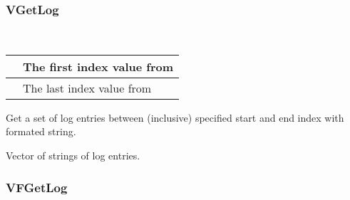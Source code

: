 \documentclass[letterpaper,10pt,english]{sphinxmanual}
\begin{document}
\subsubsection{VGetLog}
\label{\detokenize{log:vgetlog}}

\begin{fulllineitems}
\label{\detokenize{log:_CPPv2N6pessum7VGetLogEii}}%
\pysigstartmultiline
{}%
\pysigstopmultiline~

\begin{savenotes}\sphinxattablestart
\centering
\begin{tabulary}{\linewidth}[t]{|T|T|}
\hline

&
The first index value from {\hyperref[\detokenize{log:_CPPv2N6pessum11global_logsE}]{}}
\\
\hline
{}
&
The last index value from {\hyperref[\detokenize{log:_CPPv2N6pessum11global_logsE}]{}}
\\
\hline
\end{tabulary}
\par
\sphinxattableend\end{savenotes}

Get a set of log entries between (inclusive) specified start and end index
with formated string.

 Vector of strings of log entries.

\end{fulllineitems}



\subsubsection{VFGetLog}
\label{\detokenize{log:vfgetlog}}
\end{document}
